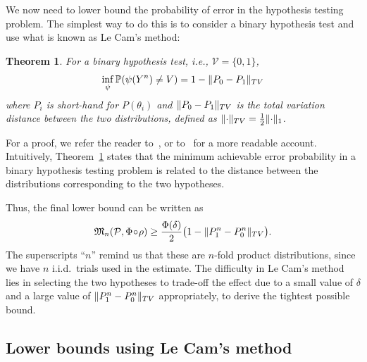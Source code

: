 \documentclass[conference,letterpaper]{IEEEtran}
\DeclarePairedDelimiter\norm{\lVert}{\rVert}
\newcommand{\Phiorho}{\Phi\!\circ\!\rho}
\newtheorem{theorem}{Theorem}
\begin{document}
We now need to lower bound the probability of error in the hypothesis testing
problem. The simplest way to do this is to consider a binary hypothesis test
and use what is known as Le Cam's method:
\begin{theorem} \label{thm:le-cam}
	For a binary hypothesis test, i.e., $\mathcal{V} = \{0, 1\}$,
	\begin{equation}
		\inf_\psi \mathbb P(\psi(Y^n) \neq V) = 1 - \norm{P_0 - P_1}_{TV}
	\end{equation}
	where $P_i$ is short-hand for $P(\theta_i)$ and $\norm{P_0 - P_1}_{TV}$ is
	the total variation distance between the two distributions, defined as
	$\norm{\cdot}_{TV} = \frac{1}{2} \norm{\cdot}_1$.
\end{theorem}
For a proof, we refer the reader to~\cite[Thm.~2.2]{Tsybakov2009Introduction},
or to~\cite[Prop.~2.11]{Duchi2015Information} for a more readable account.
Intuitively, Theorem~\ref{thm:le-cam} states that the minimum achievable error
probability in a binary hypothesis testing problem is related to the distance
between the distributions corresponding to the two hypotheses.

Thus, the final lower bound can be written as
\begin{equation} \label{eq:le-cam-bound}
	\mathfrak{M}_n(\mathcal P, \Phiorho) \geq \frac{\Phi(\delta)}{2} \big(1 - \norm{P_1^n - P_0^n}_{TV}\big).
\end{equation}
The superscripts ``$n$'' remind us that these are $n$-fold product
distributions, since we have $n$ i.i.d.\ trials used in the estimate.  The
difficulty in Le Cam's method lies in selecting the two hypotheses to trade-off
the effect due to a small value of $\delta$ and a large value of $\norm{P_1^n -
P_0^n}_{TV}$ appropriately, to derive the tightest possible bound.

\subsection{Lower bounds using Le Cam's method}
\label{sec:lecam-lb}
\end{document}
